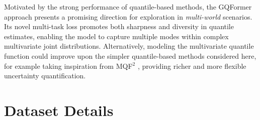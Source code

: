 \documentclass[a4paper,oneside,bibliography=totoc]{scrbook}
\begin{document}
Motivated by the strong performance of quantile-based methods, the GQFormer approach \cite{jawed_gqformer_2022} presents a promising direction for exploration in \textit{multi-world} scenarios. Its novel multi-task loss promotes both sharpness and diversity in quantile estimates, enabling the model to capture multiple modes within complex multivariate joint distributions.
Alternatively, modeling the multivariate quantile function could improve upon the simpler quantile-based methods considered here, for example taking inspiration from MQF$^2$ \cite{kan_multivariate_2022}, providing richer and more flexible uncertainty quantification.





% 



\appendix
\chapter{Dataset Details}
\label{app:data}
\end{document}
